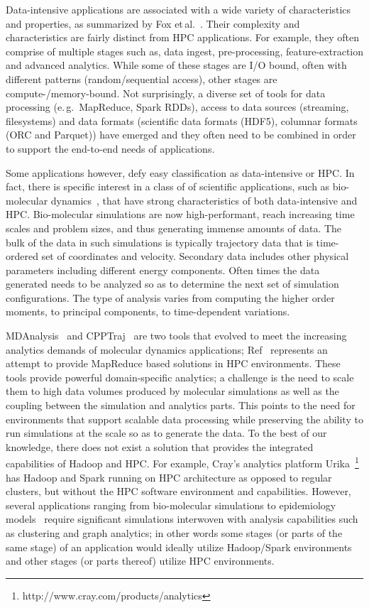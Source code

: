Data-intensive applications are associated with a wide variety of characteristics and properties, as summarized by Fox et\,al.~\cite{bigdata-ogres,bigdata-use-cases-nist}.
Their complexity and characteristics are fairly distinct from HPC applications.
For example, they often comprise of multiple stages such as, data ingest, pre-processing, feature-extraction and advanced analytics.
While some of these stages are I/O bound, often with different patterns (random/sequential access), other stages are compute-/memory-bound.
Not surprisingly, a diverse set of tools for data processing (e.\,g.\ MapReduce, Spark RDDs), access to data sources (streaming, filesystems) and data formats (scientific data formats (HDF5), columnar formats (ORC and Parquet)) have emerged and they often need to be combined in order to support the end-to-end needs of applications.

Some applications however, defy easy classification as data-intensive or HPC.
In fact, there is specific interest in a class of of scientific applications, such as bio-molecular dynamics~\cite{doi:10.1146/annurev-biophys-042910-155245}, that have strong characteristics of both data-intensive and HPC.
Bio-molecular simulations are now high-performant, reach increasing time scales and problem sizes, and thus generating immense amounts of data.
The bulk of the data in such simulations is typically trajectory data that is time-ordered set of coordinates and velocity.
Secondary data includes other physical parameters including different energy components.
Often times the data generated needs to be analyzed so as to determine the next set of simulation configurations.
The type of analysis varies from computing the higher order moments, to principal components, to time-dependent variations.

MDAnalysis~\cite{mdanalysis} and CPPTraj~\cite{doi:10.1021/ct400341p} are two tools that evolved to meet the increasing analytics demands of molecular dynamics applications; Ref~\cite{himach} represents an attempt to provide MapReduce based solutions in HPC environments.
These tools provide powerful domain-specific analytics; a challenge is the need to scale them to high data volumes produced by molecular simulations as well as the coupling between the simulation and analytics parts.
This points to the need for environments that support scalable data processing while preserving the ability to run simulations at the scale so as to generate the data.
To the best of our knowledge, there does not exist a solution that provides the integrated capabilities of Hadoop and HPC.
For example, Cray's analytics platform Urika~\footnote{http://www.cray.com/products/analytics} has Hadoop and Spark running on HPC architecture as opposed to regular clusters, but without the HPC software environment and capabilities.
However, several applications ranging from bio-molecular simulations to epidemiology models~\cite{network1} require significant simulations interwoven with analysis capabilities such as clustering and graph analytics; in other words some stages (or parts of the same stage) of an application would ideally utilize Hadoop/Spark environments and other stages (or parts thereof) utilize HPC environments.

